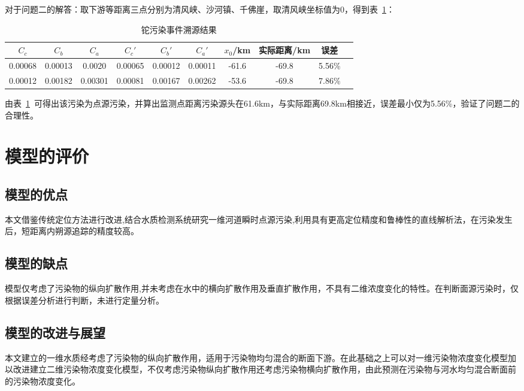 \documentclass{whutmod}
\begin{document}
对于问题二的解答：取下游等距离三点分别为清风峡、沙河镇、千佛崖，取清风峡坐标值为0，得到表~\ref{zzz}：
	\begin{table}[H]
	\caption{铊污染事件溯源结果}\label{zzz} \centering
	\begin{tabular}{cccccccccc}
		\toprule[1.5pt]
		$C_{c}$& $C_{b}$ & $C_{a}$ &${C_{c}}'$ & ${C_{b}}'$&${C_{a}}'$&$x_{0}$/km&实际距离/km& 误差\\
		\midrule[1pt]
		0.00068&0.00013 &0.0020&0.00065&0.00012&0.00011&-61.6&-69.8&5.56\%\\
		0.00012& 0.00182 &0.00301&0.00081&0.00167&0.00262&-53.6&-69.8&7.86\%\\
		\bottomrule[1.5pt]
	\end{tabular}
\end{table}
由表~\ref{zzz}~可得出该污染为点源污染，并算出监测点距离污染源头在61.6km，与实际距离69.8km相接近，误差最小仅为5.56\%，验证了问题二的合理性。


	\section{模型的评价}
	\subsection{模型的优点}
	本文借鉴传统定位方法进行改进,结合水质检测系统研究一维河道瞬时点源污染,利用具有更高定位精度和鲁棒性的直线解析法，在污染发生后，短距离内朔源追踪的精度较高。
	
	\subsection{模型的缺点}
模型仅考虑了污染物的纵向扩散作用,并未考虑在水中的横向扩散作用及垂直扩散作用，不具有二维浓度变化的特性。在判断面源污染时，仅根据误差分析进行判断，未进行定量分析。


	\subsection{模型的改进与展望}
本文建立的一维水质经考虑了污染物的纵向扩散作用，适用于污染物均匀混合的断面下游。在此基础之上可以对一维污染物浓度变化模型加以改进建立二维污染物浓度变化模型，不仅考虑污染物纵向扩散作用还考虑污染物横向扩散作用，由此预测在污染物与河水均匀混合断面前的污染物浓度变化。
	\newpage	%
	
	\printbibliography[title = {参考文献}]	%
	
\end{document}
